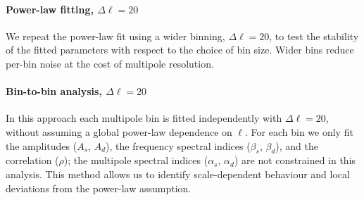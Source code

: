 \paragraph{Power-law fitting, $\Delta\ell = 20$}
We repeat the power-law fit using a wider binning, $\Delta\ell = 20$, to test the stability of the fitted parameters with respect to the choice of bin size. Wider bins reduce per-bin noise at the cost of multipole resolution.

\paragraph{Bin-to-bin analysis, $\Delta\ell = 20$}
In this approach each multipole bin is fitted independently with $\Delta\ell = 20$, without assuming a global power-law dependence on $\ell$. For each bin we only fit the amplitudes ($A_s$, $A_d$), the frequency spectral indices ($\beta_s$, $\beta_d$), and the correlation ($\rho$); the multipole spectral indices ($\alpha_s$, $\alpha_d$) are not constrained in this analysis. This method allows us to identify scale-dependent behaviour and local deviations from the power-law assumption.
